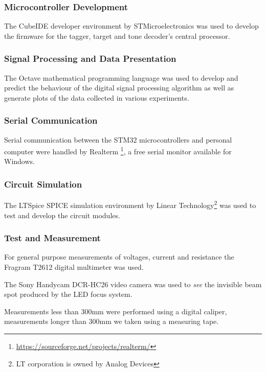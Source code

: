\subsubsection{Microcontroller Development}
The CubeIDE developer environment by STMicroelectronics was used to develop the firmware for the tagger, target and tone decoder's central processor.

\subsubsection{Signal Processing and Data Presentation}
The Octave mathematical programming language was used to develop and predict the behaviour of the digital signal processing algorithm as well as generate plots of the data collected in various experiments.

\subsubsection{Serial Communication}
Serial communication between the STM32 microcontrollers and personal computer were handled by Realterm \footnote{\url{https://sourceforge.net/projects/realterm/}}, a free serial monitor available for Windows.

\subsubsection{Circuit Simulation}
The LTSpice SPICE simulation environment by Linear Technology\footnote{LT corporation is owned by Analog Devices} was used to test and develop the circuit modules.

\subsubsection{Test and Measurement}
For general purpose measurements of voltages, current and resistance the Fragram T2612 digital multimeter was used.

The Sony Handycam DCR-HC26 video camera was used to \textit{see} the invisible beam spot produced by the LED focus system.

Measurements less than 300mm were performed using a digital caliper, measurements longer than 300mm we taken using a measuring tape.






